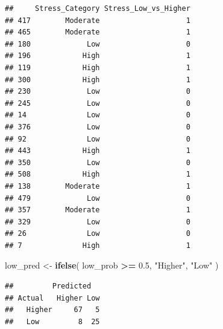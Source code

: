 \documentclass[
]{article}
\newenvironment{Shaded}{\begin{snugshade}}{\end{snugshade}}
\newcommand{\AttributeTok}[1]{\textcolor[rgb]{0.13,0.29,0.53}{#1}}
\newcommand{\DecValTok}[1]{\textcolor[rgb]{0.00,0.00,0.81}{#1}}
\newcommand{\FloatTok}[1]{\textcolor[rgb]{0.00,0.00,0.81}{#1}}
\newcommand{\FunctionTok}[1]{\textcolor[rgb]{0.13,0.29,0.53}{\textbf{#1}}}
\newcommand{\NormalTok}[1]{#1}
\newcommand{\OtherTok}[1]{\textcolor[rgb]{0.56,0.35,0.01}{#1}}
\newcommand{\SpecialCharTok}[1]{\textcolor[rgb]{0.81,0.36,0.00}{\textbf{#1}}}
\newcommand{\StringTok}[1]{\textcolor[rgb]{0.31,0.60,0.02}{#1}}
\begin{document}
\begin{verbatim}
##     Stress_Category Stress_Low_vs_Higher
## 417        Moderate                    1
## 465        Moderate                    1
## 180             Low                    0
## 196            High                    1
## 119            High                    1
## 300            High                    1
## 230             Low                    0
## 245             Low                    0
## 14              Low                    0
## 376             Low                    0
## 92              Low                    0
## 443            High                    1
## 350             Low                    0
## 508            High                    1
## 138        Moderate                    1
## 479             Low                    0
## 357        Moderate                    1
## 329             Low                    0
## 26              Low                    0
## 7              High                    1
\end{verbatim}

\begin{Shaded}
\begin{Highlighting}[]
\NormalTok{low\_pred }\OtherTok{\textless{}{-}} \FunctionTok{ifelse}\NormalTok{(}
\NormalTok{  low\_prob }\SpecialCharTok{\textgreater{}=} \FloatTok{0.5}\NormalTok{,}
  \StringTok{"Higher"}\NormalTok{,}
  \StringTok{"Low"}
\NormalTok{)}
\end{Highlighting}
\end{Shaded}

\begin{Shaded}
\end{Shaded}

\begin{verbatim}
##         Predicted
## Actual   Higher Low
##   Higher     67   5
##   Low         8  25
\end{verbatim}

\begin{Shaded}
\end{Shaded}
\end{document}
